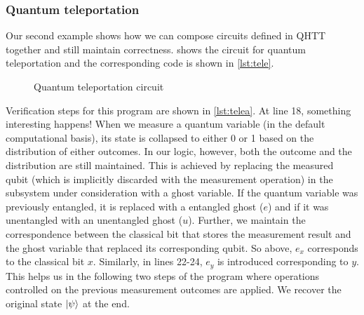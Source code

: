 \documentclass[adraft,creativecommons]{eptcs}
\theoremstyle{definition}
\theoremstyle{remark}
\begin{document}


\subsubsection{Quantum teleportation}
\label{sec:teleport}
Our second example shows how we can compose circuits defined in QHTT together and still maintain correctness.  shows the circuit for quantum teleportation and the corresponding code is shown in \cref{lst:tele}.

\begin{figure}
    \centering
    \caption{Quantum teleportation circuit}
    \label{fig:teleport}
\end{figure}





Verification steps for this program are shown in \cref{lst:telea}. At line 18, something interesting happens! When we measure a quantum variable (in the default computational basis), its state is collapsed to either 0 or 1 based on the distribution of either outcomes. In our logic, however, both the outcome and the distribution are still maintained. This is achieved by replacing the measured qubit (which is implicitly discarded with the measurement operation) in the subsystem under consideration with a ghost variable. If the quantum variable was previously entangled, it is replaced with a entangled ghost ($e$) and if it was unentangled with an unentangled ghost ($u$). Further, we maintain the correspondence between the classical bit that stores the measurement result and the ghost variable that replaced its corresponding qubit. So above, $e_x$ corresponds to the classical bit $x$. Similarly, in lines 22-24, $e_y$ is introduced corresponding to $y$. This helps us in the following two steps of the program where operations controlled on the previous measurement outcomes are applied. We recover the original state $\ket{\psi}$ at the end.
\end{document}
